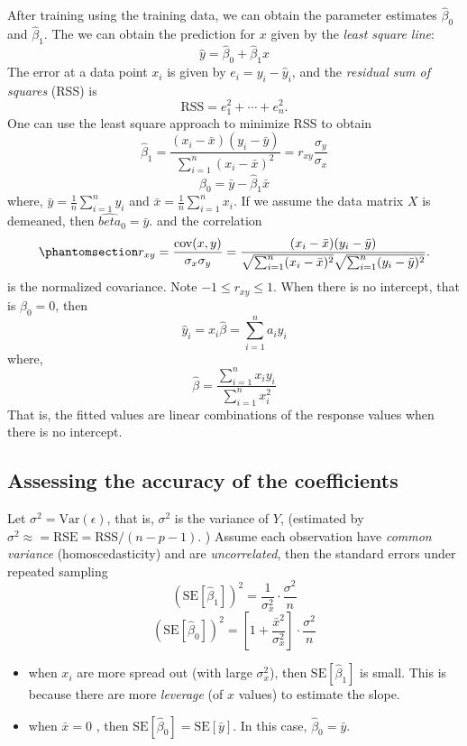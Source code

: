 \documentclass[
  letterpaper,
  DIV=11,
  numbers=noendperiod]{scrreprt}
\begin{document}
After training using the training data, we can obtain the parameter
estimates \(\hat{\beta}_0\) and \(\hat{\beta}_1\). The we can obtain the
prediction for \(x\) given by the \emph{least square line}: \[
\hat{y} = \hat{\beta}_0 + \hat{\beta}_1 x
\] The error at a data point \(x_i\) is given by
\(e_i = y_i -\hat{y}_i\), and the \emph{residual sum of squares} (RSS)
is \[
\text{RSS} =e_1^2+\cdots +e_n^2. 
\] One can use the least square approach to minimize RSS to obtain \[
\hat{\beta}_1 =\frac{(x_i-\bar{x})(y_i-\bar{y})}{\sum_{i=1}^n(x_i-\bar{x})^2}=r_{xy}\frac{\sigma_y}{\sigma_x}
\] \[
\hat{\beta}_0= \bar{y}-\hat{\beta}_1 \bar{x}
\] where, \(\bar{y}=\frac{1}{n}\sum_{i=1}^n y_i\) and
\(\bar{x}=\frac{1}{n}\sum_{i=1}^n x_i\). If we assume the data matrix
\(X\) is demeaned, then \(\hat{beta}_0=\bar{y}\). and the correlation
\begin{equation}\phantomsection\label{eq-correlation-rxy}{
r_{xy} = \frac{\text{cov}(x,y)}{\sigma_x\sigma_y}=\frac{(x_i-\bar{x})(y_i-\bar{y})}{\sqrt{\sum_{i=1}^n(x_i-\bar{x})^2}\sqrt{\sum_{i=1}^n(y_i-\bar{y})^2}}.
}\end{equation} is the normalized covariance. Note
\(-1\le r_{xy} \le 1\). When there is no intercept, that is
\(\beta_0=0\), then \[
\hat{y}_i=x_i \hat{\beta}=\sum_{i=1}^n a_i y_i
\] where, \[
\hat{\beta} =\frac{\sum_{i=1}^n x_iy_i}{ \sum_{i=1}^{n} x_i^2}
\] That is, the fitted values are linear combinations of the response
values when there is no intercept.

\subsection{Assessing the accuracy of the
coefficients}\label{assessing-the-accuracy-of-the-coefficients}

Let \(\sigma^2=\text{Var}(\epsilon)\), that is, \(\sigma^2\) is the
variance of \(Y\), (estimated by
\(\sigma^2\approx =\text{RSE} =\text{RSS}/(n-p-1)\). ) Assume each
observation have \emph{common variance} (homoscedasticity) and are
\emph{uncorrelated}, then the standard errors under repeated sampling \[
(\text{SE}[\hat{\beta}_1])^2 = \frac{1}{\sigma^2_x}\cdot \frac{\sigma^2}{n}
\] \[
(\text{SE}[\hat{\beta}_0])^2 = \left[1+ \frac{\bar{x}^2}{\sigma^2_x} \right]\cdot \frac{\sigma^2}{n}
\]

\begin{itemize}
\item
  when \(x_i\) are more spread out (with large \(\sigma_x^2\)), then
  \(\text{SE}[\hat{\beta}_1]\) is small. This is because there are more
  \emph{leverage} (of \(x\) values) to estimate the slope.
\item
  when \(\bar{x} =0\) , then
  \(\text{SE}[\hat{\beta}_0] = \text{SE}[\bar{y}]\). In this case,
  \(\hat{\beta}_0 = \bar{y}\).
\end{itemize}
\end{document}
